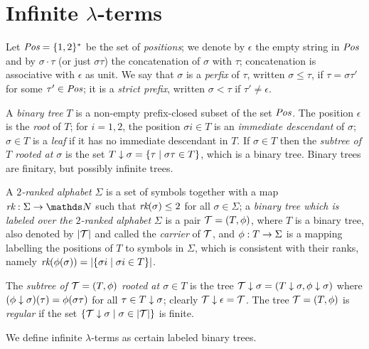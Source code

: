 \section{Infinite $\lambda$-terms}\label{sec:infinite-terms}

Let $\textit{Pos} = \{ 1, 2 \}^*$ be the set of {\em positions}; 
we denote by $\epsilon$ the empty string in $\textit{Pos}$ 
and by $\sigma\cdot\tau$ (or just $\sigma\tau$) the concatenation of $\sigma$ with
$\tau$; concatenation is associative with  $\epsilon$ as unit. We say that $\sigma$ is a {\em perfix} of $\tau$,
written $\sigma \leq \tau$, if $\tau = \sigma \tau'$ for some 
$\tau' \in \textit{Pos}$; it is a {\em strict prefix}, written $\sigma < \tau$
if $\tau' \neq \epsilon$.

A {\em binary tree} $T$ is a non-empty prefix-closed subset of the set
$\textit{Pos}$. The position $\epsilon$ is the {\em root} of $T$; 
for $i = 1,2$, the position $\sigma i \in T$ is an {\em immediate descendant} of $\sigma$;
$\sigma \in T$ is a {\em leaf} if it has no immediate descendant in $T$. 
If $\sigma \in T$ then the {\em subtree of $T$ rooted at $\sigma$} is the set 
$T \downarrow \sigma = \{ \tau \mid \sigma \tau \in T \}$, which is
a binary tree. Binary trees are finitary, but possibly infinite trees. %

A {\em $2$-ranked alphabet}
$\Sigma$ is a set of symbols together with a map $\rank:\Sigma \to \nat$
such that $\textit{rk}(\sigma) \leq 2$ for all $\sigma \in \Sigma$; a {\em binary tree which is labeled over
the $2$-ranked alphabet} $\Sigma$ is a pair $\BTree = (T, \phi)$, where $T$ is a binary tree, 
also denoted by $|\BTree|$  and called the {\em carrier} of $\BTree$, and
$\phi : T \to \Sigma$ is a mapping labelling the positions of $T$ to symbols in $\Sigma$, 
which is consistent with their ranks,
namely $\textit{rk}(\phi(\sigma)) = |\{ \sigma i \mid \sigma i \in T \}|$.

The {\em subtree of $\BTree = (T, \LabelFun)$ rooted at $\sigma \in T$} is the tree 
$\SubTree{\BTree}{\sigma} = (\SubTree{T}{\sigma}, \SubTree{\LabelFun}{\sigma})$
where $(\phi \downarrow \sigma) (\tau) = \phi(\sigma \tau)$ for all
$\tau \in T \downarrow \sigma$; clearly $\SubTree{\BTree}{\epsilon} = \BTree$.
The tree $\BTree = (T, \LabelFun)$ is {\em regular}
if the set $\set{\SubTree{\BTree}{\sigma} \mid \sigma \in |\BTree|}$ is finite.

We define infinite $\lambda$-terms as certain labeled binary trees.
\medskip

